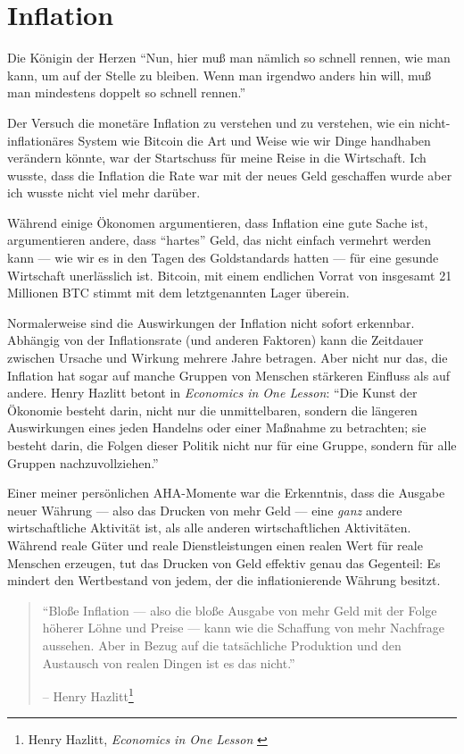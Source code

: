 \chapter{Inflation}
\label{les:9}

\begin{chapquote}{Die Königin der Herzen}
\enquote{Nun, hier muß man nämlich so schnell rennen, wie man kann, um auf der
Stelle zu bleiben. Wenn man irgendwo anders hin will, muß man mindestens doppelt
so schnell rennen.}
\end{chapquote}

Der Versuch die monetäre Inflation zu verstehen und zu verstehen, wie ein
nicht-inflationäres System wie Bitcoin die Art und Weise wie wir Dinge handhaben
verändern könnte, war der Startschuss für meine Reise in die Wirtschaft. Ich
wusste, dass die Inflation die Rate war mit der neues Geld geschaffen wurde aber
ich wusste nicht viel mehr darüber.

Während einige Ökonomen argumentieren, dass Inflation eine gute Sache ist,
argumentieren andere, dass \enquote{hartes} Geld, das nicht einfach vermehrt
werden kann — wie wir es in den Tagen des Goldstandards hatten --- für eine
gesunde Wirtschaft unerlässlich ist. Bitcoin, mit einem endlichen Vorrat von
insgesamt 21 Millionen BTC stimmt mit dem letztgenannten Lager überein.

Normalerweise sind die Auswirkungen der Inflation nicht sofort erkennbar.
Abhängig von der Inflationsrate (und anderen Faktoren) kann die Zeitdauer
zwischen Ursache und Wirkung mehrere Jahre betragen. Aber nicht nur das, die
Inflation hat sogar auf manche Gruppen von Menschen stärkeren Einfluss als auf
andere. Henry Hazlitt betont in \textit{Economics in One Lesson}: \enquote{Die
Kunst der Ökonomie besteht darin, nicht nur die unmittelbaren, sondern die
längeren Auswirkungen eines jeden Handelns oder einer Maßnahme zu betrachten;
sie besteht darin, die Folgen dieser Politik nicht nur für eine Gruppe, sondern
für alle Gruppen nachzuvollziehen.}

Einer meiner persönlichen AHA-Momente war die Erkenntnis, dass die Ausgabe neuer
Währung --- also das Drucken von mehr Geld --- eine \textit{ganz} andere
wirtschaftliche Aktivität ist, als alle anderen wirtschaftlichen Aktivitäten.
Während reale Güter und reale Dienstleistungen einen realen Wert für reale
Menschen erzeugen, tut das Drucken von Geld effektiv genau das Gegenteil: Es
mindert den Wertbestand von jedem, der die inflationierende Währung besitzt.

\begin{quotation}\begin{samepage}
\enquote{Bloße Inflation --- also die bloße Ausgabe von mehr Geld mit der Folge
höherer Löhne und Preise --- kann wie die Schaffung von mehr Nachfrage aussehen.
Aber in Bezug auf die tatsächliche Produktion und den Austausch von realen
Dingen ist es das nicht.}
\begin{flushright} -- Henry Hazlitt\footnote{Henry Hazlitt, \textit{Economics in
One Lesson} \cite{hazlitt}}
\end{flushright}\end{samepage}\end{quotation}

